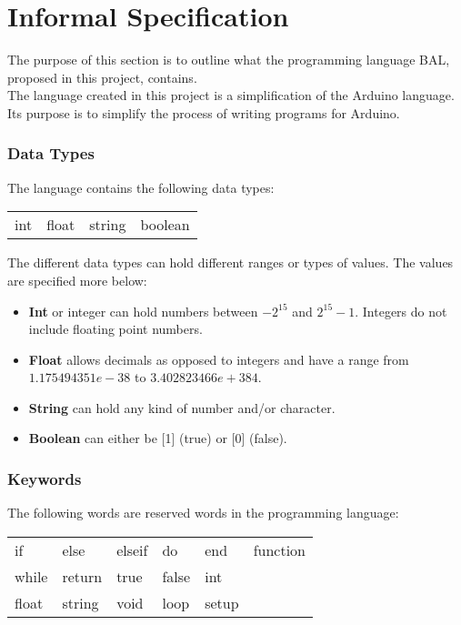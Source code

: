 \chapter{Informal Specification}\label{analysis:informal-specification}
The purpose of this section is to outline what the programming language BAL, proposed in this project, contains.
\\The language created in this project is a simplification of the Arduino language. Its purpose is to simplify the process of writing programs for Arduino.   

\subsection{Data Types}
The language contains the following data types: \\ 
\begin{center}
\begin{tabular}{ l l l l}
int & float & string & boolean \\
\end{tabular}
\end{center}

The different data types can hold different ranges or types of values. The values are specified more below: 
\begin{itemize}
\item \textbf{Int} or integer can hold numbers between $-2^{15}$ and $2^{15}-1$. Integers do not include floating point numbers.
\item \textbf{Float} allows decimals as opposed to integers and have a range from $1.175494351e-38$ to $3.402823466e+384$.
\item \textbf{String} can hold any kind of number and/or character. 
\item \textbf{Boolean} can either be [1] (true) or [0] (false). 
\end{itemize}

\subsection{Keywords}
The following words are reserved words in the programming language:\\ 
\begin{center}
\begin{tabular}{ l l l l l l}
if & else & elseif & do & end & function \\
while & return & true & false & int \\
float & string & void & loop & setup \\
\end{tabular}
\end{center}

